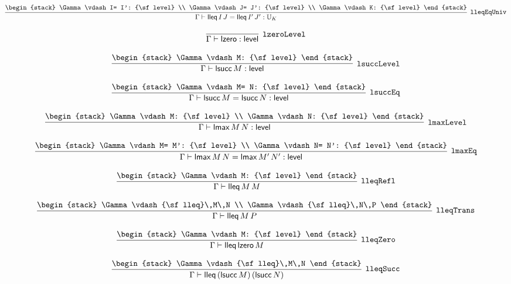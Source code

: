 \[
\infer[{\tt lleqEqUniv}]{\Gamma \vdash {\sf lleq}\,I\,J= {\sf lleq}\,I'\,J': {\Bbb U}_{K}}{
\begin{stack}
\Gamma \vdash I= I': {\sf level}
\\
\Gamma \vdash J= J': {\sf level}
\\
\Gamma \vdash K: {\sf level}
\end{stack}}
\]

\[
\infer[{\tt lzeroLevel}]{\Gamma \vdash {\sf lzero}: {\sf level}}{}
\]

\[
\infer[{\tt lsuccLevel}]{\Gamma \vdash {\sf lsucc}\,M: {\sf level}}{
\begin{stack}
\Gamma \vdash M: {\sf level}
\end{stack}}
\]

\[
\infer[{\tt lsuccEq}]{\Gamma \vdash {\sf lsucc}\,M= {\sf lsucc}\,N: {\sf level}}{
\begin{stack}
\Gamma \vdash M= N: {\sf level}
\end{stack}}
\]

\[
\infer[{\tt lmaxLevel}]{\Gamma \vdash {\sf lmax}\,M\,N: {\sf level}}{
\begin{stack}
\Gamma \vdash M: {\sf level}
\\
\Gamma \vdash N: {\sf level}
\end{stack}}
\]

\[
\infer[{\tt lmaxEq}]{\Gamma \vdash {\sf lmax}\,M\,N= {\sf lmax}\,M'\,N': {\sf level}}{
\begin{stack}
\Gamma \vdash M= M': {\sf level}
\\
\Gamma \vdash N= N': {\sf level}
\end{stack}}
\]

\[
\infer[{\tt lleqRefl}]{\Gamma \vdash {\sf lleq}\,M\,M}{
\begin{stack}
\Gamma \vdash M: {\sf level}
\end{stack}}
\]

\[
\infer[{\tt lleqTrans}]{\Gamma \vdash {\sf lleq}\,M\,P}{
\begin{stack}
\Gamma \vdash {\sf lleq}\,M\,N
\\
\Gamma \vdash {\sf lleq}\,N\,P
\end{stack}}
\]

\[
\infer[{\tt lleqZero}]{\Gamma \vdash {\sf lleq}\,{\sf lzero}\,M}{
\begin{stack}
\Gamma \vdash M: {\sf level}
\end{stack}}
\]

\[
\infer[{\tt lleqSucc}]{\Gamma \vdash {\sf lleq}\,({\sf lsucc}\,M)\,({\sf lsucc}\,N)}{
\begin{stack}
\Gamma \vdash {\sf lleq}\,M\,N
\end{stack}}
\]

